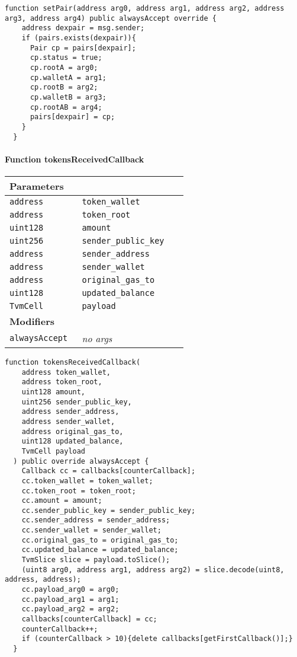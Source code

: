 \vspace{2cm}

\begin{lstlisting}[firstnumber=127]
  function setPair(address arg0, address arg1, address arg2, address arg3, address arg4) public alwaysAccept override {
    address dexpair = msg.sender;
    if (pairs.exists(dexpair)){
      Pair cp = pairs[dexpair];
      cp.status = true;
      cp.rootA = arg0;
      cp.walletA = arg1;
      cp.rootB = arg2;
      cp.walletB = arg3;
      cp.rootAB = arg4;
      pairs[dexpair] = cp;
    }
  }
\end{lstlisting}

\paragraph{Function tokensReceivedCallback}


\ifsoltables
\noindent\begin{tabular}{|l|l|p{5cm}|}\hline
\multicolumn{3}{|l|}{\bf Parameters}\\\hline
\tt address & \tt token\_{}wallet &\\\hline
\tt address & \tt token\_{}root &\\\hline
\tt uint128 & \tt amount &\\\hline
\tt uint256 & \tt sender\_{}public\_{}key &\\\hline
\tt address & \tt sender\_{}address &\\\hline
\tt address & \tt sender\_{}wallet &\\\hline
\tt address & \tt original\_{}gas\_{}to &\\\hline
\tt uint128 & \tt updated\_{}balance &\\\hline
\tt TvmCell & \tt payload &\\\hline
\multicolumn{3}{|l|}{\bf Modifiers}\\\hline
\tt alwaysAccept & {\em no args} &\\\hline
\end{tabular}
\fi

\vspace{2cm}

\begin{lstlisting}[firstnumber=286]
  function tokensReceivedCallback(
    address token_wallet,
    address token_root,
    uint128 amount,
    uint256 sender_public_key,
    address sender_address,
    address sender_wallet,
    address original_gas_to,
    uint128 updated_balance,
    TvmCell payload
  ) public override alwaysAccept {
    Callback cc = callbacks[counterCallback];
    cc.token_wallet = token_wallet;
    cc.token_root = token_root;
    cc.amount = amount;
    cc.sender_public_key = sender_public_key;
    cc.sender_address = sender_address;
    cc.sender_wallet = sender_wallet;
    cc.original_gas_to = original_gas_to;
    cc.updated_balance = updated_balance;
    TvmSlice slice = payload.toSlice();
    (uint8 arg0, address arg1, address arg2) = slice.decode(uint8, address, address);
    cc.payload_arg0 = arg0;
    cc.payload_arg1 = arg1;
    cc.payload_arg2 = arg2;
    callbacks[counterCallback] = cc;
    counterCallback++;
    if (counterCallback > 10){delete callbacks[getFirstCallback()];}
  }
\end{lstlisting}

